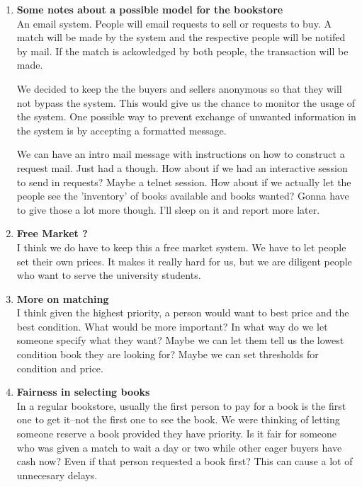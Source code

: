 \begin{enumerate}
\item  {\bf Some notes about a possible model for the bookstore}\\
An email system.  People will email requests to sell or requests to
buy.  A match will be made by the system and the respective people
will be notifed by mail.  If the match is ackowledged by both people,
the transaction will be made.

We decided to keep the the buyers and sellers anonymous so that they
will not bypass the system.  This would give us the chance to monitor
the usage of the system.  One possible way to prevent exchange of
unwanted information in the system is by accepting a formatted
message.

We can have an intro mail message with instructions on how to
construct a request mail.  Just had a though.  How about if we had an
interactive session to send in requests?  Maybe a telnet session.  How
about if we actually let the people see the 'inventory' of books
available and books wanted?  Gonna have to give those a lot more
though.  I'll sleep on it and report more later.


\item {\bf Free Market ?}\\

I think we do have to keep this a free market system.  We have to let
people set their own prices.  It makes it really hard for us, but we
are diligent people who want to serve the university students.


\item  {\bf More on matching}\\

I think given the highest priority, a person would want to best price
and the best condition.  What would be more important?  In what way do
we let someone specify what they want?  Maybe we can let them tell us
the lowest condition book they are looking for?
Maybe we can set thresholds for condition and price.


\item {\bf Fairness in selecting books}\\

In a regular bookstore, usually the first person to pay for a book is
the first one to get it--not the first one to see the book.  We were
thinking of letting someone reserve a book provided they have
priority.  Is it fair for someone who was given a match to wait a day
or two while other eager buyers have cash now?  Even if that person
requested a book first?  This can cause a lot of unnecesary delays.



\end{enumerate}
